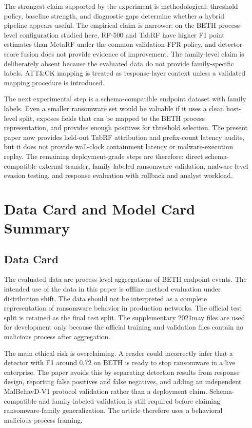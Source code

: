 \documentclass[journal]{IEEEtran}
\begin{document}
The strongest claim supported by the experiment is methodological: threshold policy, baseline strength, and diagnostic gaps determine whether a hybrid pipeline appears useful. The empirical claim is narrower: on the BETH process-level configuration studied here, RF-500 and TabRF have higher F1 point estimates than MetaRF under the common validation-FPR policy, and detector-score fusion does not provide evidence of improvement. The family-level claim is deliberately absent because the evaluated data do not provide family-specific labels. ATT\&CK mapping is treated as response-layer context unless a validated mapping procedure is introduced.

The next experimental step is a schema-compatible endpoint dataset with family labels. Even a smaller ransomware set would be valuable if it uses a clean host-level split, exposes fields that can be mapped to the BETH process representation, and provides enough positives for threshold selection. The present paper now provides held-out TabRF attribution and prefix-count latency audits, but it does not provide wall-clock containment latency or malware-execution replay. The remaining deployment-grade steps are therefore: direct schema-compatible external transfer, family-labeled ransomware validation, malware-level evasion testing, and response evaluation with rollback and analyst workload.

\section{Data Card and Model Card Summary}
\label{sec:cards}

\subsection{Data Card}

The evaluated data are process-level aggregations of BETH endpoint events. The intended use of the data in this paper is offline method evaluation under distribution shift. The data should not be interpreted as a complete representation of ransomware behavior in production networks. The official test split is retained as the final test split. The supplementary 2021may files are used for development only because the official training and validation files contain no malicious process after aggregation.

The main ethical risk is overclaiming. A reader could incorrectly infer that a detector with F1 around 0.72 on BETH is ready to stop ransomware in a live enterprise. The paper avoids this by separating detection results from response design, reporting false positives and false negatives, and adding an independent MalBehavD-V1 protocol validation rather than a deployment claim. Schema-compatible and family-labeled validation is still required before claiming ransomware-family generalization. The article therefore uses a behavioral malicious-process framing.
\end{document}
